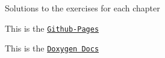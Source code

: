 Solutions to the exercises for each chapter

This is the \href{https://codefroespuc.github.io/learningOpencv3/}{\tt Github-\/\+Pages}

This is the \href{https://codefroespuc.github.io/learningOpencv3/dox/}{\tt Doxygen Docs} 